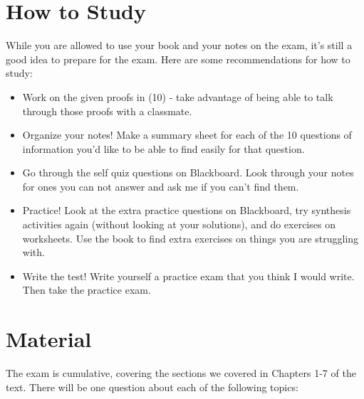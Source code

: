 \documentclass[12pt]{amsart}
\theoremstyle{definition}
\begin{document}
\section{How to Study}

While you are allowed to use your book and your notes on the exam, it's still a good idea to prepare for the exam. Here are some recommendations for how to study:
\begin{itemize}
\item Work on the given proofs in (10) - take advantage of being able to talk through those proofs with a classmate.
\item Organize your notes! Make a summary sheet for each of the 10 questions of information you'd like to be able to find easily for that question.
\item Go through the self quiz questions on Blackboard. Look through your notes for ones you can not answer and ask me if you can't find them.
\item Practice!  Look at the extra practice questions on Blackboard, try synthesis activities again (without looking at your solutions), and do exercises on worksheets.  Use the book to find extra exercises on things you are struggling with.
\item Write the test! Write yourself a practice exam that you think I would write.  Then take the practice exam.  
\end{itemize}
\newpage


\section{Material}
The exam is cumulative, covering the sections we covered in Chapters 1-7 of the text. There will be one question about each of the following topics:
\end{document}
